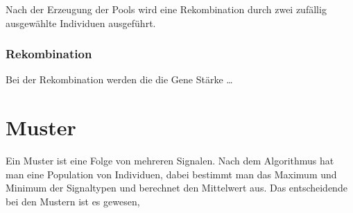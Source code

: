 Nach der Erzeugung der Pools wird eine Rekombination durch zwei zuf{\"a}llig ausgew{\"a}hlte Individuen ausgef{\"u}hrt.


\subsubsection{Rekombination}
Bei der Rekombination werden die die Gene St{\"a}rke 
\dots

\section{Muster}
Ein Muster ist eine Folge von mehreren Signalen. 
Nach dem Algorithmus hat man eine Population von Individuen, dabei bestimmt man das Maximum und Minimum der Signaltypen und berechnet den Mittelwert aus.
 Das entscheidende bei den Mustern ist es gewesen,  
